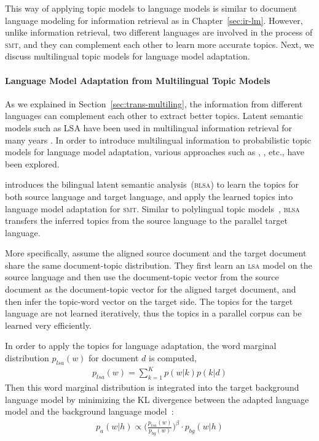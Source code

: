 This way of applying topic models to language models is 
similar to document language modeling for information retrieval
as in Chapter~\ref{sec:ir-lm}. However, unlike
information retrieval, two different languages are involved in the
process of \textsc{smt}, and they can complement each other to learn
more accurate topics. Next, we discuss multilingual topic models
for language model adaptation.

\paragraph{Language Model Adaptation from Multilingual Topic Models}

As we explained in Section~\ref{sec:trans-multiling}, the information
from different languages can complement each other to extract better
topics. Latent semantic models such as LSA have been used in multilingual information retrieval for many years \cite{carbonell1997translingual}.
In order to introduce multilingual information to probabilistic topic models
for language model adaptation, various approaches such as
\cite{Tam-2007}, \cite{Ruiz-2011}, \cite{Yu-2013} etc., have been
explored. 

\cite{Tam-2007} introduces the bilingual latent semantic
analysis~(\textsc{blsa}) to learn the topics for both source language
and target language, and apply the learned topics into language model
adaptation for \textsc{smt}. Similar to polylingual topic models~\citep{mimno-09}, 
\textsc{blsa} transfers the inferred
topics from the source language to the parallel target language.

More specifically, \cite{Tam-2007} assume the aligned source document
and the target document share the same document-topic distribution.
They first learn an \textsc{lsa} model on the source
language and then use the document-topic vector from the
source document as the document-topic vector for the aligned
target document, and then infer the topic-word vector on the
target side. The topics for the target language are not learned
iteratively, thus the topics in a parallel corpus can be learned very
efficiently.

In order to apply the topics for language adaptation, the word
marginal distribution $p_{lsa}(w)$ for document $d$ is computed,
\begin{align}
p_{lsa}(w) = \sum_{k=1}^K p(w|k) p(k|d)
\end{align}
Then this word marginal distribution is integrated into the target background language model by minimizing the KL divergence between the adapted language model and the background language model~\citep{Kneser-1997b}:
\begin{align}
\label{eq:mdi}
p_a(w|h) \propto \Big( \frac{p_{lsa}(w)}{p_{bg}(w)} \Big) ^{\beta} \cdot p_{bg}(w|h)
\end{align}

